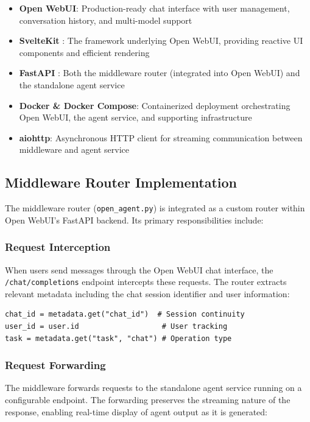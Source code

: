 \begin{itemize}
    \item \textbf{Open WebUI}: Production-ready chat interface with user management, conversation history, and multi-model support
    \item \textbf{SvelteKit} \cite{svelte2024}: The framework underlying Open WebUI, providing reactive UI components and efficient rendering
    \item \textbf{FastAPI} \cite{fastapi2024}: Both the middleware router (integrated into Open WebUI) and the standalone agent service
    \item \textbf{Docker \& Docker Compose}: Containerized deployment orchestrating Open WebUI, the agent service, and supporting infrastructure
    \item \textbf{aiohttp}: Asynchronous HTTP client for streaming communication between middleware and agent service
\end{itemize}

\subsection{Middleware Router Implementation}

The middleware router (\texttt{open\_agent.py}) is integrated as a custom router within Open WebUI's FastAPI backend. Its primary responsibilities include:

\subsubsection{Request Interception}

When users send messages through the Open WebUI chat interface, the \texttt{/chat/completions} endpoint intercepts these requests. The router extracts relevant metadata including the chat session identifier and user information:

\begin{verbatim}
chat_id = metadata.get("chat_id")  # Session continuity
user_id = user.id                   # User tracking
task = metadata.get("task", "chat") # Operation type
\end{verbatim}

\subsubsection{Request Forwarding}

The middleware forwards requests to the standalone agent service running on a configurable endpoint. The forwarding preserves the streaming nature of the response, enabling real-time display of agent output as it is generated:

